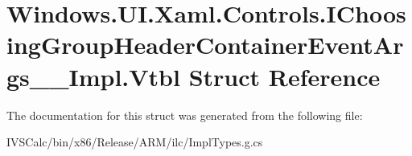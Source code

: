 \hypertarget{struct_windows_1_1_u_i_1_1_xaml_1_1_controls_1_1_i_choosing_group_header_container_event_args_____impl_1_1_vtbl}{}\section{Windows.\+U\+I.\+Xaml.\+Controls.\+I\+Choosing\+Group\+Header\+Container\+Event\+Args\+\_\+\+\_\+\+Impl.\+Vtbl Struct Reference}
\label{struct_windows_1_1_u_i_1_1_xaml_1_1_controls_1_1_i_choosing_group_header_container_event_args_____impl_1_1_vtbl}


The documentation for this struct was generated from the following file\+:\begin{DoxyCompactItemize}
\item 
I\+V\+S\+Calc/bin/x86/\+Release/\+A\+R\+M/ilc/Impl\+Types.\+g.\+cs\end{DoxyCompactItemize}
